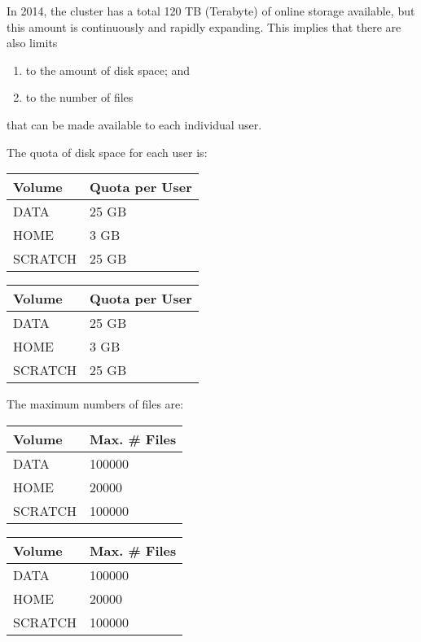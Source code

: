 In 2014, the \hpc cluster has a total 120 TB (Terabyte) of online storage
available, but this amount is continuously and rapidly expanding. This implies
that there are also limits
\begin{enumerate}
\item  to the amount of disk space; and
\item  to the number of files
\end{enumerate}

that can be made available to each individual \hpc user.

The quota of disk space for each \hpc user is:

\ifantwerpen
\begin{tabular}{|p{0.7in}|p{1.0in}|} \hline
\textbf{Volume} & \textbf{Quota per User} \\ \hline
DATA            & 25 GB \\ \hline
HOME            & 3 GB \\ \hline
SCRATCH         & 25 GB \\ \hline
\end{tabular}
\fi
\ifgent
\begin{tabular}{|p{0.7in}|p{1.0in}|} \hline
\textbf{Volume} & \textbf{Quota per User} \\ \hline
DATA            & 25 GB \\ \hline
HOME            & 3 GB \\ \hline
SCRATCH         & 25 GB \\ \hline
\end{tabular}
\fi

The maximum numbers of files are:

\ifantwerpen
\begin{tabular}{|p{0.7in}|p{1.0in}|} \hline
\textbf{Volume} & \textbf{Max. \# Files} \\ \hline
DATA            & 100000 \\ \hline
HOME            & 20000 \\ \hline
SCRATCH         & 100000 \\ \hline
\end{tabular}
\fi

\ifgent
\begin{tabular}{|p{0.7in}|p{1.0in}|} \hline
\textbf{Volume} & \textbf{Max. \# Files} \\ \hline
DATA            & 100000 \\ \hline
HOME            & 20000 \\ \hline
SCRATCH         & 100000 \\ \hline
\end{tabular}
\fi


